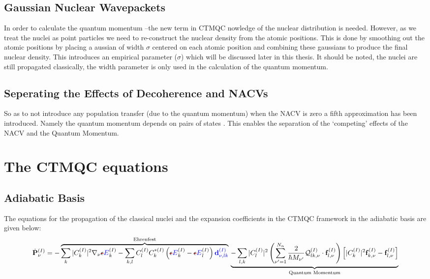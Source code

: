 \subsection{Gaussian Nuclear Wavepackets}
In order to calculate the quantum momentum --the new term in CTMQC nowledge of the nuclear distribution is needed. However, as we treat the nuclei as point particles we need to re-construct the nuclear density from the atomic positions. This is done by smoothing out the atomic positions by placing a aussian of width $\sigma$ centered on each atomic position and combining these gaussians to produce the final nuclear density. This introduces an empirical parameter ($\sigma$) which will be discussed later in this thesis. It should be noted, the nuclei are still propagated classically, the width parameter is only used in the calculation of the quantum momentum.
\subsection{Seperating the Effects of Decoherence and NACVs}
So as to not introduce any population transfer (due to the quantum momentum) when the NACV is zero a fifth approximation has been introduced. Namely the quantum momentum depends on pairs of states \replace{--}{,}. This enables the separation of the `competing' effects of the NACV and the Quantum Momentum.
\section{The CTMQC equations}
\subsection{Adiabatic Basis}
\label{sec:ad_eqns}
The equations for the propagation of the classical nuclei and the expansion coefficients in the CTMQC framework in the adiabatic basis are given below:
\begin{dmath}
  \dot{\mathbf{P}}_{\nu}^{(I)} =
  -\overbrace{
     \sum_{k} |C_{k}^{(I)}|^2 \nabla_{\nu}\mremove{\epsilon}\madd{E}_{k}^{(I)}
	 - \sum_{k,l} C_{l}^{(I)} C_{k}^{* (I)} \left(\mremove{\epsilon}\madd{E}_{k}^{(I)}  - \mremove{\epsilon}\madd{E}_{l}^{(I)}   \right) \madd{\mathbf{d}_{\nu, lk}^{(I)}}
  }^{\text{Ehrenfest}}
  \\
  \underbrace{
    - \sum_{l,k} |C_{l}^{(I)}|^2 \left( \sum_{\nu'=1}^{N_n}    \frac{2}{\hbar M_{\nu'}} \mathcal{Q}_{lk, \nu}^{(I)} \cdot    \mathbf{f}_{l, \nu}^{(I)} \right)\left[ |C_{k}^{(I)}|^2    \mathbf{f}_{k,\nu}^{(I)} - \mathbf{f}_{l,\nu}^{(I)} \right]
  }_{\text{Quantum Momentum}}
    \label{eq:nuc_adiab}
\end{dmath}

